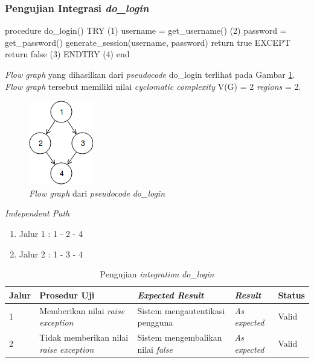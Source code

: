 \subsubsection{Pengujian Integrasi \emph{do\_login}}

\begin{code}
\begin{ignasicblock}[title=do\_login,minted language=text]
procedure do_login()
    TRY                                     (1)
       username = get_username()            (2)
       password = get_password()
       generate_session(username, password)
       return true
    EXCEPT
       return false                         (3)
    ENDTRY                                  (4)
end
\end{ignasicblock}
\label{pc:login}
\end{code}

\par\null\par
\noindent
\emph{Flow graph} yang dihasilkan dari \emph{pseudocode}
do\_login terlihat pada Gambar \ref{cfg:login}. \emph{Flow graph} tersebut memiliki nilai
\emph{cyclomatic complexity} V(G) = 2 \emph{regions} = 2.

\begin{figure}[H]
  \centering
  \includegraphics[width=.14\linewidth]{img/test-case/4node}
  \caption{\emph{Flow graph} dari \emph{pseudocode} \emph{do\_login}}
  \label{cfg:login}
\end{figure}

\noindent
\emph{Independent Path}

\begin{enumerate}
\item Jalur 1 : 1 - 2 - 4
\item Jalur 2 : 1 - 3 - 4
\end{enumerate}

\begin{longtable}{|P{.06\textwidth}|P{.30\textwidth}|P{.30\textwidth}|P{.10\textwidth}|P{.08\textwidth}|}
  \caption{Pengujian \emph{integration} \emph{do\_login}} \label{jalur:login}\\
  \hline
  \textbf{Jalur} & \textbf{Prosedur Uji} & \textbf{\emph{Expected Result}}
  & \textbf{\emph{Result}} & \textbf{Status} \\\hline
  1 & Memberikan nilai  \emph{raise exception} & Sistem mengautentikasi pengguna & \emph{As expected} & Valid \\\hline
  2 & Tidak memberikan nilai  \emph{raise exception} & Sistem mengembalikan nilai \emph{false}
  & \emph{As expected} & Valid \\\hline
\end{longtable}

